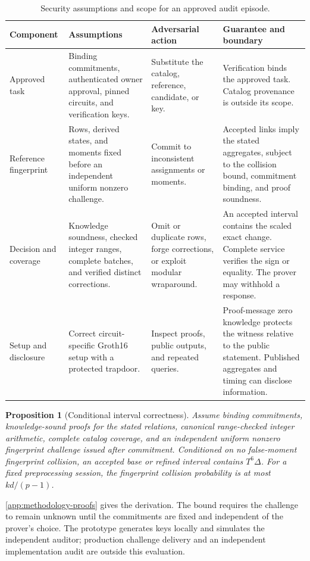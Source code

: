 \documentclass[5p,times,twocolumn]{elsarticle}
\newtheorem{proposition}{Proposition}
\begin{document}
\begin{table}[tbp]
\centering\small
\caption{Security assumptions and scope for an approved audit episode.}
\label{tab:security-assumptions}
\begin{tabularx}{\textwidth}{@{}p{}*{3}{>{\raggedright\arraybackslash}X}@{}}\toprule
Component & Assumptions & Adversarial action & Guarantee and boundary\\\midrule
Approved task & Binding commitments, authenticated owner approval, pinned circuits, and verification keys. & Substitute the catalog, reference, candidate, or key. & Verification binds the approved task. Catalog provenance is outside its scope.\\
\addlinespace[2pt]
Reference fingerprint & Rows, derived states, and moments fixed before an independent uniform nonzero challenge. & Commit to inconsistent assignments or moments. & Accepted links imply the stated aggregates, subject to the collision bound, commitment binding, and proof soundness.\\
\addlinespace[2pt]
Decision and coverage & Knowledge soundness, checked integer ranges, complete batches, and verified distinct corrections. & Omit or duplicate rows, forge corrections, or exploit modular wraparound. & An accepted interval contains the scaled exact change. Complete service verifies the sign or equality. The prover may withhold a response.\\
\addlinespace[2pt]
Setup and disclosure & Correct circuit-specific Groth16 setup with a protected trapdoor. & Inspect proofs, public outputs, and repeated queries. & Proof-message zero knowledge protects the witness relative to the public statement. Published aggregates and timing can disclose information.\\
\bottomrule\end{tabularx}
\end{table}

\begin{proposition}[Conditional interval correctness]
\label{prop:methodology-correctness}
Assume binding commitments, knowledge-sound proofs for the stated relations, canonical range-checked integer arithmetic, complete catalog coverage, and an independent uniform nonzero fingerprint challenge issued after commitment. Conditioned on no false-moment fingerprint collision, an accepted base or refined interval contains $T^6\Delta$. For a fixed preprocessing session, the fingerprint collision probability is at most $kd/(p-1)$.
\end{proposition}
\ref{app:methodology-proofs} gives the derivation. The bound requires the challenge to remain unknown until the commitments are fixed and independent of the prover's choice. The prototype generates keys locally and simulates the independent auditor; production challenge delivery and an independent implementation audit are outside this evaluation.
\end{document}
